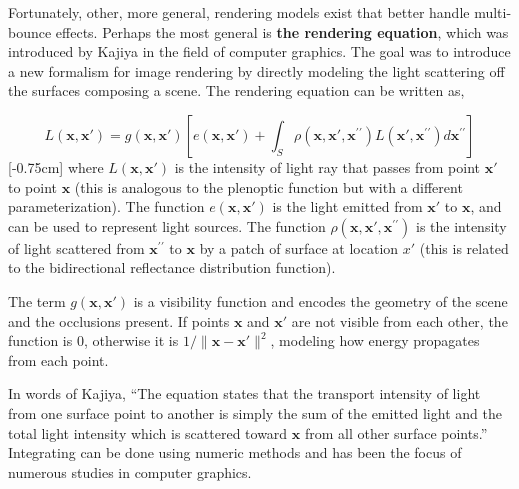 Fortunately, other, more general, rendering models exist that better handle multi-bounce effects. Perhaps the most general is \textbf{the rendering equation}, which was introduced by Kajiya \cite{Kajiya1986} in the field of computer graphics. The goal was to introduce a new formalism for image rendering by directly modeling the light scattering off the surfaces composing a scene. The rendering equation can be written as,

\begin{equation}
L(\mathbf{x},\mathbf{x}') = g(\mathbf{x},\mathbf{x}') \left[ e(\mathbf{x},\mathbf{x}') + \int_S \rho(\mathbf{x},\mathbf{x}',\mathbf{x}^{\prime\prime}) L(\mathbf{x}',\mathbf{x}^{\prime\prime}) d\mathbf{x}^{\prime\prime} \right]
\label{eq:nerf:Kajiya_rendering_equation}
\end{equation}
[-0.75cm]
where $L(\mathbf{x},\mathbf{x}')$ is the intensity of light ray that passes from point $\mathbf{x}'$ to point $\mathbf{x}$ (this is analogous to the plenoptic function but with a different parameterization). The function $e(\mathbf{x},\mathbf{x}')$ is the light emitted from $\mathbf{x}'$ to $\mathbf{x}$, and can be used to represent light sources. The function $\rho(\mathbf{x},\mathbf{x}',\mathbf{x}^{\prime\prime})$ is the intensity of light scattered from $\mathbf{x}^{\prime\prime}$ to $\mathbf{x}$ by a patch of surface at location $x'$ (this is related to the bidirectional reflectance distribution function).


The term $g(\mathbf{x}, \mathbf{x}')$ is a visibility function and encodes the geometry of the scene and the occlusions present. If points $\mathbf{x}$ and $\mathbf{x}'$ are not visible from each other, the function is 0, otherwise it is $1/\lVert \mathbf{x}-\mathbf{x}' \rVert ^2$, modeling how energy propagates from each point.  

In words of Kajiya, ``The equation states that the transport intensity of light from one surface point to another is simply the sum of the emitted light and the total light intensity which is scattered toward $\mathbf{x}$ from all other surface points.'' Integrating \eqn{\ref{eq:nerf:Kajiya_rendering_equation}} can be done using numeric methods and has been the focus of numerous studies in computer graphics. 


